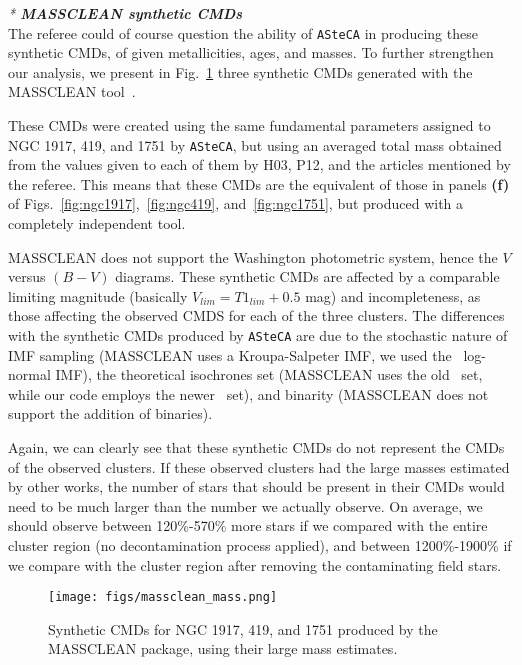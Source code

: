 \documentclass{article}
\begin{document}
\clearpage
\noindent \emph{* \textbf{MASSCLEAN synthetic CMDs}}\\

The referee could of course question the ability of \texttt{ASteCA} in producing
these synthetic CMDs, of given metallicities, ages, and masses.
%
To further strengthen our analysis, we present in
Fig.~\ref{fig:massclean_mass} three synthetic CMDs generated with the
MASSCLEAN tool~\citep[][]{Popescu_2009}.

These CMDs were created using the same fundamental parameters assigned to NGC
1917, 419, and 1751 by \texttt{ASteCA}, but using an averaged total mass
obtained from the values given to each of them by H03, P12, and the articles
mentioned by the referee.
This means that these CMDs are the equivalent of those in panels
\textbf{(f)} of Figs.~\ref{fig:ngc1917},~\ref{fig:ngc419},
and~\ref{fig:ngc1751}, but produced with a completely independent tool.

MASSCLEAN does not support the Washington photometric system, hence the $V$
versus $(B-V)$ diagrams. These synthetic CMDs are affected by a comparable
limiting magnitude (basically $V_{lim}=T1_{lim} + 0.5$ mag) and incompleteness,
as those affecting the observed CMDS for each of the three clusters. The
differences with the synthetic CMDs produced by \texttt{ASteCA} are due to the
stochastic nature of IMF sampling (MASSCLEAN uses a Kroupa-Salpeter IMF, we
used the~\citealp{Chabrier_2001} log-normal IMF), the theoretical isochrones
set (MASSCLEAN uses the old~\citealp{Marigo_2008} set, while our code employs
the newer~\citealp{Bressan_2012} set), and binarity (MASSCLEAN does not support
the addition of binaries).

Again, we can clearly see that these synthetic CMDs do not represent
the CMDs of the observed clusters. If these observed clusters had the large
masses estimated by other works, the number of stars that should be
present in their CMDs would need to be much larger than the number we
actually observe.
On average, we should observe between 120\%-570\% more stars if
we compared with the entire cluster region (no decontamination process applied),
and between 1200\%-1900\% if we compare with the cluster region after
removing the contaminating field stars.\\

\begin{figure}
    \texttt{[image: figs/massclean\_mass.png]}
    \caption{Synthetic CMDs for NGC 1917, 419, and 1751 produced by the
    MASSCLEAN package, using their large mass estimates.}
\label{fig:massclean_mass}
\end{figure}
\end{document}
